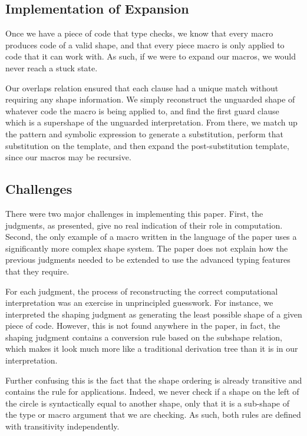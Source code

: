 \documentclass[11pt]{article}
\begin{document}
\subsection{Implementation of Expansion}

Once we have a piece of code that type checks, we know that every macro produces code of a valid shape, and that every piece macro is only applied to code that it can work with. As such, if we were to expand our macros, we would never reach a stuck state.

Our overlaps relation ensured that each clause had a unique match without requiring any shape information. We simply reconstruct the unguarded shape of whatever code the macro is being applied to, and find the first guard clause which is a supershape of the unguarded interpretation. From there, we match up the pattern and symbolic expression to generate a substitution, perform that substitution on the template, and then expand the post-substitution template, since our macros may be recursive. 

\subsection{Challenges}

There were two major challenges in implementing this paper. First, the judgments, as presented, give no real indication of their role in computation. Second, the only example of a macro written in the language of the paper uses a significantly more complex shape system. The paper does not explain how the previous judgments needed to be extended to use the advanced typing features that they require.

For each judgment, the process of reconstructing the correct computational interpretation was an exercise in unprincipled guesswork. For instance, we interpreted the shaping judgment as generating the least possible shape of a given piece of code. However, this is not found anywhere in the paper, in fact, the shaping judgment contains a conversion rule based on the subshape relation, which makes it look much more like a traditional derivation tree than it is in our interpretation. 

Further confusing this is the fact that the shape ordering is already transitive and contains the rule for applications. Indeed, we never check if a shape on the left of the circle is syntactically equal to another shape, only that it is a sub-shape of the type or macro argument that we are checking. As such, both rules are defined with transitivity independently.
\end{document}
